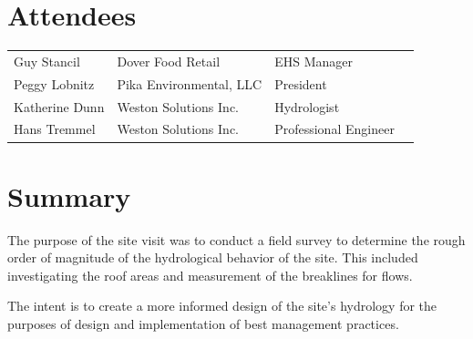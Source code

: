 \documentclass{article}
\begin{document}
\section*{Attendees}
\begin{table}[h]
  \label{tab:label}
  \begin{tabular}{l l l l}
      Guy Stancil & Dover Food Retail & EHS Manager \\
      Peggy Lobnitz & Pika Environmental, LLC & President \\
      Katherine Dunn & Weston Solutions Inc. & Hydrologist \\
      Hans Tremmel & Weston Solutions Inc. & Professional Engineer \\
  \end{tabular}
\end{table}

\section*{Summary}

The purpose of the site visit was to conduct a field survey to determine the
rough order of magnitude of the hydrological behavior of the site.  This
included investigating the roof areas and measurement of the breaklines for
flows.

The intent is to create a more informed design of the site's hydrology for the
purposes of design and implementation of best management practices.

\newpage


\end{document}
